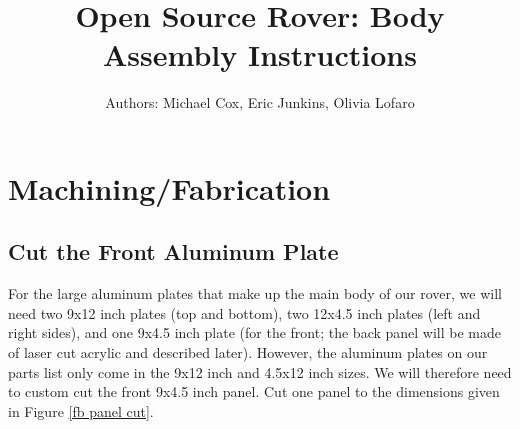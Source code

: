 \documentclass[12pt]{article}
\begin{document}
\newcommand\partimg{\includegraphics[width=2cm,height=1.25cm,keepaspectratio]}

\title{Open Source Rover: Body Assembly Instructions}
\author{Authors: Michael Cox, Eric Junkins, Olivia Lofaro}

\makeatletter
\def\@maketitle{
\begin{center}
	\makebox[\textwidth][c]{ \texttt{[image: "Pictures/Body/Body title".png]}}
	{\Huge \bfseries \sffamily \@title }\\[3ex]
	{\Large \sffamily \@author}\\[3ex]
	\texttt{[image: "Pictures/Misc/JPL logo".png]}
\end{center}}
\makeatother

\maketitle



\newpage


\tableofcontents

\newpage

\section{Machining/Fabrication}
\subsection{Cut the Front Aluminum Plate}

For the large aluminum plates that make up the main body of our rover, we will need two 9x12 inch plates (top and bottom),  two 12x4.5 inch plates (left and right sides), and one 9x4.5 inch plate (for the front; the back panel will be made of laser cut acrylic and described later).  However, the aluminum plates on our parts list only come in the 9x12 inch and 4.5x12 inch sizes.  We will therefore need to custom cut the front 9x4.5 inch panel.  Cut one panel to the dimensions given in  Figure \ref{fb panel cut}.
\end{document}
